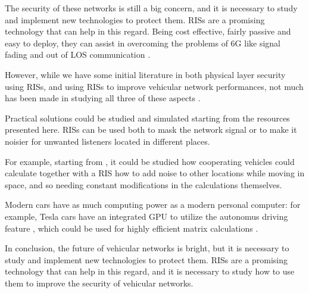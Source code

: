 The security of these networks is still a big concern, and it is necessary to study and implement new technologies to protect them. RISs are a promising technology that can help in this regard. Being cost effective, fairly passive and easy to deploy, they can assist in overcoming the problems of 6G like signal fading and out of LOS communication \cite{8796365}.

However, while we have some initial literature in both physical layer security using RISs, and using RISs to improve vehicular network performances, not much has been made in studying all three of these aspects \cite{makarfi2020reconfigurableintelligentsurfacesenabledvehicular}.

Practical solutions could be studied and simulated starting from the resources presented here. RISs can be used both to mask the network signal or to make it noisier for unwanted listeners located in different places.

For example, starting from \cite{4543070}, it could be studied how cooperating vehicles could calculate together with a RIS how to add noise to other locations while moving in space, and so needing constant modifications in the calculations themselves.

Modern cars have as much computing power as a modern personal computer: for example, Tesla cars have an integrated GPU to utilize the autonomus driving feature \cite{10586734}, which could be used for highly efficient matrix calculations \cite{1011452699470}.

In conclusion, the future of vehicular networks is bright, but it is necessary to study and implement new technologies to protect them. RISs are a promising technology that can help in this regard, and it is necessary to study how to use them to improve the security of vehicular networks.